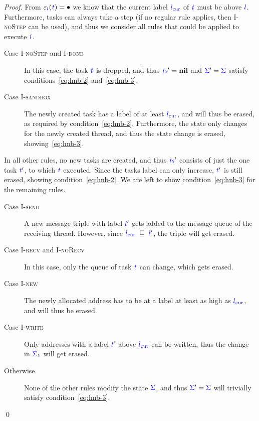 \documentclass{llncs}
\newcommand{\Varid}[1]{\mathit{#1}}
\begin{document}
\begin{proof}
  From $\ensuremath{\varepsilon_{\ifc{l}}(\ifc{\Varid{t}})}=\ensuremath{\bullet}$ we know that the current label \ensuremath{\lcurr} of \ensuremath{\ifc{\Varid{t}}}
  must be above \ensuremath{\ifc{l}}.  Furthermore, tasks can always take a step (if no
  regular rule applies, then \textsc{I-noStep} can be used), and thus
  we consider all rules that could be applied to execute \ensuremath{\ifc{\Varid{t}}}.
  \begin{description}
    \item[Case \textsc{I-noStep} and \textsc{I-done}]
    In this case, the task \ensuremath{\ifc{\Varid{t}}} is dropped,
    and thus \ensuremath{\ifc{\Varid{ts}}'\mathrel{=}\mathbf{nil}} and \ensuremath{\ifc{\Sigma}'\mathrel{=}\ifc{\Sigma}} satisfy
    conditions~\eqref{eq:hnb-2} and~\eqref{eq:hnb-3}.
    \item[Case \textsc{I-sandbox}]
    The newly created task has a label of at least \ensuremath{\lcurr}, and will thus be
    erased, as required by condition~\eqref{eq:hnb-2}.  Furthermore, the
    state only changes for the newly created thread, and thus the state
    change is erased, showing~\eqref{eq:hnb-3}.
  \end{description}
  In all other rules, no new tasks are created, and thus \ensuremath{\ifc{\Varid{ts}}'} consists of just
  the one task \ensuremath{\ifc{\Varid{t}}'}, to which \ensuremath{\ifc{\Varid{t}}} executed.  Since the tasks label can
  only increase, \ensuremath{\ifc{\Varid{t}}'} is still erased, showing condition~\eqref{eq:hnb-2}.
  We are left to show condition~\eqref{eq:hnb-3} for the remaining rules.
  \begin{description}
    \item[Case \textsc{I-send}]
    A new message triple with label \ensuremath{\ifc{l}'} gets added to the message
    queue of the receiving thread.  However, since \ensuremath{\lcurr\;\flows{}\;\ifc{l}'},
    the triple will get erased.
    \item[Case \textsc{I-recv} and \textsc{I-noRecv}]
    In this case, only the queue of
    task \ensuremath{\ifc{\Varid{t}}} can change, which gets erased.
    \item[Case \textsc{I-new}] The newly allocated address has to be at a
    label at least as high as \ensuremath{\lcurr}, and will thus be erased.
    \item[Case \textsc{I-write}] Only addresses with a label \ensuremath{\ifc{l}'} above
    \ensuremath{\lcurr} can be written, thus the change in \ensuremath{\ifc{\Sigma}_{1}} will get erased.
    \item[Otherwise.]  None of the other rules modify the state \ensuremath{\ifc{\Sigma}}, and
    thus \ensuremath{\ifc{\Sigma}'\mathrel{=}\ifc{\Sigma}} will trivially satisfy condition~\eqref{eq:hnb-3}.
  \end{description}
  \qed
\end{proof}
\end{document}
